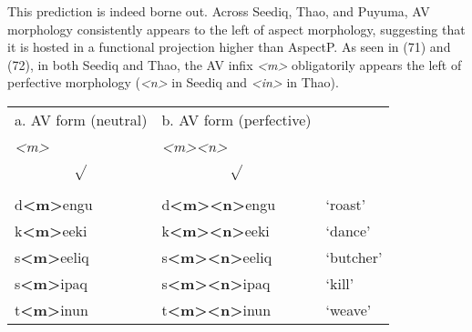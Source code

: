 \documentclass[10pt]{article}
\begin{document}
This prediction is indeed borne out. Across Seediq, Thao, and Puyuma, AV morphology consistently appears to the left of aspect morphology, suggesting that it is hosted in a functional projection higher than AspectP. As seen in (71) and (72), in both Seediq and Thao, the AV infix \textit{<m>}  obligatorily appears the left of perfective morphology (\textit{<n>} in Seediq and \textit{<in>} in Thao).

\newpage

\begin{exe}
\begin{table}[h]
\hspace{+1cm}\begin{tabular}{lll} %
     a. AV form (neutral) & b. AV form (perfective) &  
     \\
    \hspace{+5mm}\textit{<m>\hspace{-1mm}\[
    \sqrt{\vphantom{^2}}
    \]} & \textit{<m><n>\hspace{-1mm}\[
    \sqrt{\vphantom{^2}}
    \]} & \\\midrule
    d\textbf{<m>}engu   & d\textbf{<m><n>}engu  & `roast'               \\
    k\textbf{<m>}eeki    &  k\textbf{<m><n>}eeki & `dance' \\
    s\textbf{<m>}eeliq & s\textbf{<m><n>}eeliq & `butcher'\\
    s\textbf{<m>}ipaq & s\textbf{<m><n>}ipaq & `kill'\\
    t\textbf{<m>}inun & t\textbf{<m><n>}inun & `weave' \\ \bottomrule 
\end{tabular}
\end{table}
\end{exe}
\end{document}
